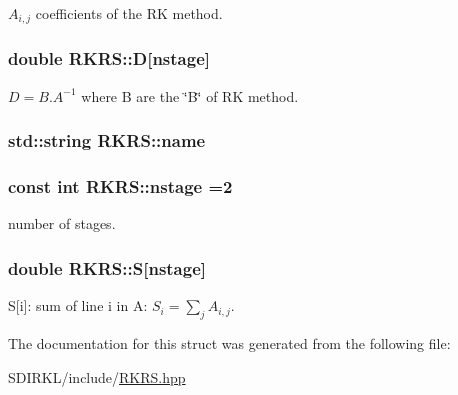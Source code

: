 $ A_{i,j}$ coefficients of the R\-K method. 

\hypertarget{structRKRS_a5be93dfb653420eab1d0a82cf8bc300a}{
\subsubsection[{D}]{\setlength{\rightskip}{0pt plus 5cm}double R\-K\-R\-S\-::\-D\mbox{[}{\bf nstage}\mbox{]}}}\label{structRKRS_a5be93dfb653420eab1d0a82cf8bc300a}


$ D= B.A^{-1} $ where B are the \char`\"{}\-B\char`\"{} of R\-K method. 

\hypertarget{structRKRS_a11dc1b36a8782a6e54292c2b7e094388}{
\subsubsection[{name}]{\setlength{\rightskip}{0pt plus 5cm}std\-::string R\-K\-R\-S\-::name}}\label{structRKRS_a11dc1b36a8782a6e54292c2b7e094388}
\hypertarget{structRKRS_a23e21baa68ac24250d6217d88fb218d5}{
\subsubsection[{nstage}]{\setlength{\rightskip}{0pt plus 5cm}const int R\-K\-R\-S\-::nstage =2\hspace{0.3cm}{\ttfamily [static]}}}\label{structRKRS_a23e21baa68ac24250d6217d88fb218d5}


number of stages. 

\hypertarget{structRKRS_a96d64516ddc45beb5a9b328adff1fb1c}{
\subsubsection[{S}]{\setlength{\rightskip}{0pt plus 5cm}double R\-K\-R\-S\-::\-S\mbox{[}{\bf nstage}\mbox{]}}}\label{structRKRS_a96d64516ddc45beb5a9b328adff1fb1c}


S\mbox{[}i\mbox{]}\-: sum of line i in A\-: $ S_i= \sum_j A_{i,j}$. 



The documentation for this struct was generated from the following file\-:\begin{DoxyCompactItemize}
\item 
S\-D\-I\-R\-K\-L/include/\hyperlink{RKRS_8hpp}{R\-K\-R\-S.\-hpp}\end{DoxyCompactItemize}
